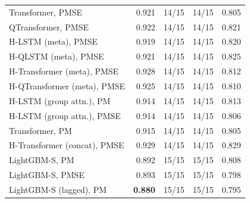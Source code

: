 \begin{tabular}{lrrrr}
Transformer, PMSE & 0.921 & 14/15 & 14/15 & 0.805 \\
QTransformer, PMSE & 0.922 & 14/15 & 14/15 & 0.821 \\
H-LSTM (meta), PMSE & 0.919 & 14/15 & 14/15 & 0.820 \\
H-QLSTM (meta), PMSE & 0.921 & 14/15 & 14/15 & 0.825 \\
H-Transformer (meta), PMSE & 0.928 & 14/15 & 14/15 & 0.812 \\
H-QTransformer (meta), PMSE & 0.925 & 14/15 & 14/15 & 0.810 \\
H-LSTM (group attn.), PM & 0.914 & 14/15 & 14/15 & 0.813 \\
H-LSTM (group attn.), PMSE & 0.914 & 14/15 & 14/15 & 0.806 \\
Transformer, PM & 0.915 & 14/15 & 14/15 & 0.805 \\
H-Transformer (concat), PMSE & 0.929 & 14/15 & 14/15 & 0.829 \\
LightGBM-S, PM & 0.892 & 15/15 & 15/15 & 0.808 \\
LightGBM-S, PMSE & 0.893 & 15/15 & 15/15 & 0.798 \\
LightGBM-S (lagged), PM & \textbf{0.880} & 15/15 & 15/15 & 0.795 \\
\bottomrule
\end{tabular}
